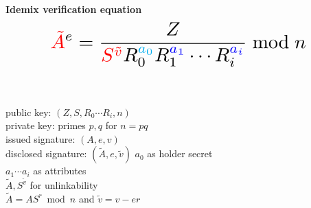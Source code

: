 % 


\usepackage{outlines}
\usepackage{appendixnumberbeamer}
\usepackage{array}
\usepackage{booktabs}

\usepackage{xspace} 

\usepackage{tikz}
\usepackage{amsmath}
\usepackage{mathtools}
\usepackage{wrapfig}
\usepackage{makecell}
\usepackage[makeroom]{cancel}
\usepackage{xcolor}
\usepackage{calc}

\makeatletter
\makeatother
{}

\usepackage{textpos}






\begin{frame} 
  \textbf{Idemix verification equation}\\
  \[ \scalebox{2}{$\displaystyle {\color{red}\tilde{A}}^e = \frac{Z}{{\color{red}S^{\tilde{v}}} \displaystyle R_0^{{\color{cyan}a_0}} R_1^{{\color{blue}a_1}} \cdots R_i^{{\color{blue}a_i}}} \bmod n $}
      \]\\[3em]

  \begin{columns}[onlytextwidth]
    public key: $(Z, S, R_0 \cdots R_i, n)$\\
    private key: primes $p,q$ for $n=pq$\\[1em]
    issued signature: $(A,e,v)$\\
    disclosed signature: $(\tilde{A},e,\tilde{v})$
    {\color{cyan}$a_0$ as holder secret}\\
    {\color{blue}$a_1 \cdots a_i$ as attributes}\\
    {\color{red}$\tilde{A}, S^{\tilde{v}}$ for unlinkability}\\
    $ \tilde{A} = AS^{r} \bmod n$ and $\tilde{v} = v - er $
  \end{columns}
  \end{frame}

